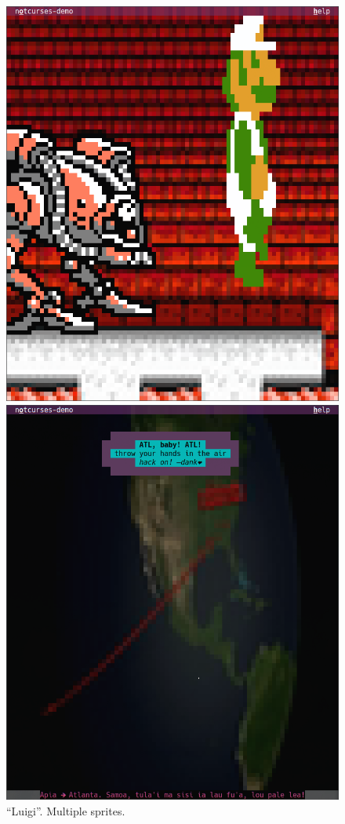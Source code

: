 \documentclass[letterpaper,10pt]{article}
\begin{document}
\begin{figure}
  \centering
  \begin{minipage}{0.45\textwidth}
    \includegraphics[width=1\linewidth]{media/demo-luigi.png}
    \caption{``Luigi''. Multiple sprites.}
  \end{minipage}\hfill
  \begin{minipage}{0.45\textwidth}
    \includegraphics[width=1\linewidth]{media/demo-outro.png}

\end{minipage}
\end{figure}
\end{document}

